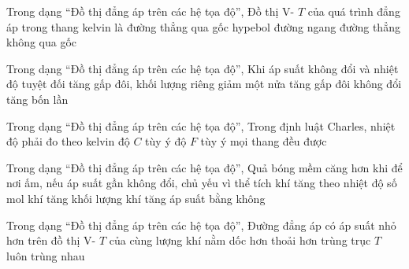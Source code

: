 \begin{ex}
Trong dạng “Đồ thị đẳng áp trên các hệ tọa độ”, Đồ thị V- $T$ của quá trình đẳng áp trong thang kelvin là
\choice
{\True đường thẳng qua gốc}
{hypebol}
{đường ngang}
{đường thẳng không qua gốc}
\end{ex}

\begin{ex}
Trong dạng “Đồ thị đẳng áp trên các hệ tọa độ”, Khi áp suất không đổi và nhiệt độ tuyệt đối tăng gấp đôi, khối lượng riêng
\choice
{\True giảm một nửa}
{tăng gấp đôi}
{không đổi}
{tăng bốn lần}
\end{ex}

\begin{ex}
Trong dạng “Đồ thị đẳng áp trên các hệ tọa độ”, Trong định luật Charles, nhiệt độ phải đo theo
\choice
{\True kelvin}
{độ $C$ tùy ý}
{độ $F$ tùy ý}
{mọi thang đều được}
\end{ex}

\begin{ex}
Trong dạng “Đồ thị đẳng áp trên các hệ tọa độ”, Quả bóng mềm căng hơn khi để nơi ấm, nếu áp suất gần không đổi, chủ yếu vì
\choice
{\True thể tích khí tăng theo nhiệt độ}
{số mol khí tăng}
{khối lượng khí tăng}
{áp suất bằng không}
\end{ex}

\begin{ex}
Trong dạng “Đồ thị đẳng áp trên các hệ tọa độ”, Đường đẳng áp có áp suất nhỏ hơn trên đồ thị V- $T$ của cùng lượng khí nằm
\choice
{\True dốc hơn}
{thoải hơn}
{trùng trục $T$}
{luôn trùng nhau}
\end{ex}

